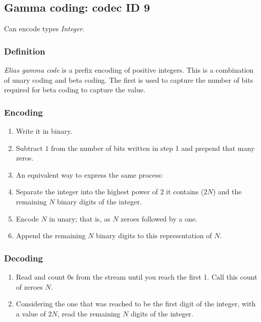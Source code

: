 \documentclass[a4paper]{article}
\begin{document}
\subsection{Gamma coding: codec ID 9}

Can encode types \textit{Integer}.

\subsubsection*{Definition}

\emph{Elias gamma code} is a prefix encoding of positive integers. This is a combination 
of unary coding and beta coding. The first is used to capture the number of bits 
required for beta coding to capture the value. 

\subsubsection*{Encoding}

\begin{enumerate}
\item Write it in binary.

\item Subtract $1$ from the number of bits written in step 1 and prepend that many zeros.

\item An equivalent way to express the same process:

\item Separate the integer into the highest power of $2$ it contains ($2N$) and the remaining 
$N$ binary digits of the integer.

\item Encode $N$ in unary; that is, as $N$ zeroes followed by a one.

\item Append the remaining $N$ binary digits to this representation of $N$.
\end{enumerate}

\subsubsection*{Decoding}

\begin{enumerate}
\item Read and count 0s from the stream until you reach the first 1. Call this count 
of zeroes $N$.

\item Considering the one that was reached to be the first digit of the integer, with 
a value of $2N$, read the remaining $N$ digits of the integer.
\end{enumerate}
\end{document}
